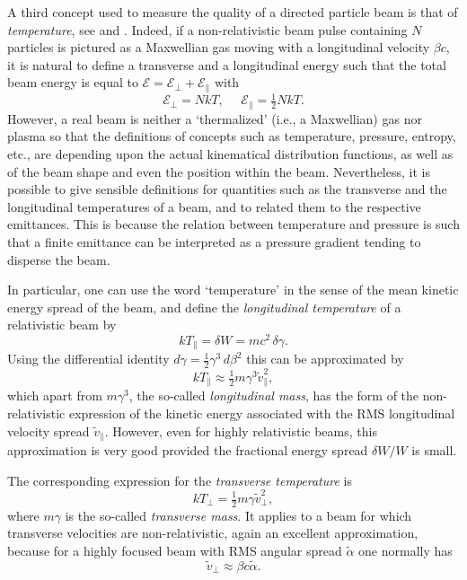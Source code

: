 \documentclass [12pt,a4paper,     ]{report} %
\begin{document}
   A third concept used to measure the quality of a directed particle beam is that of \emph{temperature}, see  \cite[p.207]{LAWSO1977-} and \cite{LAWSO1973-}. Indeed, if a non-relativistic beam pulse containing $N$ particles is pictured as a Maxwellian gas moving with a longitudinal velocity $\beta c$, it is natural to define a transverse and a longitudinal energy such that the total beam energy is equal to $\mathcal{E} = \mathcal{E}_{\perp} + \mathcal{E}_{\|}$ with
%
\begin{equation}\label{def:12} %
	\mathcal{E}_{\perp} = N kT,     ~~~  ~~~ 
        \mathcal{E}_{\|} = \tfrac{1}{2} N kT.
\end{equation}
%
However, a real beam is neither a `thermalized' (i.e., a Maxwellian) gas nor plasma so that the definitions of concepts such as temperature, pressure, entropy, etc., are depending upon the actual kinematical distribution functions, as well as of the beam shape and even the position within the beam. Nevertheless, it is possible to give sensible definitions for quantities such as the transverse and the longitudinal temperatures of a beam, and to related them to the respective emittances.  This is because the relation between temperature and pressure is such that a finite emittance can be interpreted as a pressure gradient tending to disperse the beam.

  In particular, one can use the word `temperature' in the sense of the mean kinetic energy spread of the beam, and define the \emph{longitudinal temperature} of a relativistic beam by
%
\begin{equation}\label{def:13} %
           kT_{\|} = \delta W =  mc^2 \, \delta\gamma. 
\end{equation}
%
Using the differential identity $d\gamma = \tfrac{1}{2} \gamma^3 \, d \beta^2$ this can be approximated by
%
\begin{equation}\label{def:14} %
          kT_{\|} \approx \tfrac{1}{2}  m \gamma^3 \tilde{v}_{\|}^2,
\end{equation}
%
which apart from $m\gamma^3$, the so-called \emph{longitudinal mass}, has the form of the non-relativistic expression of the kinetic energy associated with the RMS longitudinal velocity spread $\tilde{v}_{\|}$.  However, even for highly relativistic beams, this approximation is very good provided the fractional energy spread $\delta W/W$ is small. 

   The corresponding expression for the \emph{transverse temperature} is
%
\begin{equation}\label{def:15} %
  kT_{\perp} =  \tfrac{1}{2} m \gamma \tilde{v}_{\perp}^2, 
\end{equation}
%
where $m\gamma$ is the so-called \emph{transverse mass}. It applies to a beam for which transverse velocities are non-relativistic, again an excellent approximation, because for a highly focused beam with RMS angular spread $\tilde{\alpha}$ one normally has
%
\begin{equation}\label{def:16} %
     \tilde{v}_{\perp} \approx  \beta c \tilde{\alpha}.
\end{equation}
%
\end{document}
